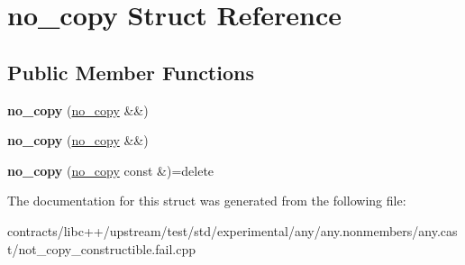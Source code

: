 \hypertarget{structno__copy}{}\section{no\+\_\+copy Struct Reference}
\label{structno__copy}
\subsection*{Public Member Functions}
\begin{DoxyCompactItemize}
\item 
\mbox{\label{structno__copy_ac87e7f65f863df97449b80e97c3e0a8f}} 
{\bfseries no\+\_\+copy} (\mbox{\hyperlink{structno__copy}{no\+\_\+copy}} \&\&)
\item 
\mbox{\label{structno__copy_ac87e7f65f863df97449b80e97c3e0a8f}} 
{\bfseries no\+\_\+copy} (\mbox{\hyperlink{structno__copy}{no\+\_\+copy}} \&\&)
\item 
\mbox{\label{structno__copy_af7763a000a9a06dca0263a237f42fc41}} 
{\bfseries no\+\_\+copy} (\mbox{\hyperlink{structno__copy}{no\+\_\+copy}} const \&)=delete
\end{DoxyCompactItemize}


The documentation for this struct was generated from the following file\+:\begin{DoxyCompactItemize}
\item 
contracts/libc++/upstream/test/std/experimental/any/any.\+nonmembers/any.\+cast/not\+\_\+copy\+\_\+constructible.\+fail.\+cpp\end{DoxyCompactItemize}
